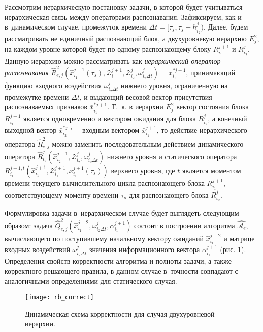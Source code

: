 Рассмотрим иерархическую постановку задачи, в которой будет учитываться иерархическая связь между операторами распознавания. Зафиксируем, как и в~динамическом случае, промежуток времени $\Delta t=[\tau_s,\tau_s+h_{i_2}^j)$. Далее, будем рассматривать не единичный распознающий блок, а двухуровневую иерархию $E_j^2$, на каждом уровне которой будет по одному распознающему блоку $R_{i_1}^{j+1}$ и $R_{i_2}^j$. Данную иерархию можно рассматривать как \textit{иерархический оператор распознавания} $\hat R_{e,j}^2(\hat x_{i_1}^{j+1}(\tau_s),\mathcal Z_{i_1}^{j+1},\mathcal Z_{i_2}^j,\omega_{i_2\Delta t}^j)=\bar x_{i_1}^{*j+1}$, принимающий функцию входного воздействия $\omega_{i_2\Delta t}^j$ нижнего уровня, ограниченную на промежутке времени $\Delta t$, и выдающий весовой вектор присутствия распознаваемых признаков $\bar x_{i_1}^{*j+1}$. Т.~к. в иерархии $E_j^2$ вектор состояния блока $R_{i_1}^{j+1}$ является одновременно и вектором ожидания для блока $R_{i_2}^j$, а конечный выходной вектор $\bar x_{i_2}^{*j}$ "--- входным вектором $\bar x_{i_1}^{j+1}$, то действие иерархического оператора $\hat R_{e,j}^2$ можно заменить последовательным действием динамического оператора $\hat R_{i_2}^j(\hat x _{i_2}^{j+1},\mathcal Z_{i_2}^j,\omega_{i_2\Delta t}^j)$ нижнего уровня и статического оператора $R_{i_1}^{j+1,t}(\hat x _{i_1}^{j+1},\mathcal Z_{i_1}^{j+1},\bar x_{i_1}^{j+1}(\tau_s))$ верхнего уровня, где $t$ является моментом времени текущего вычислительного цикла распознающего блока $R_{i_1}^{j+1}$, соответствующему моменту времени $\tau_s$ для распознающего блока $R_{i_2}^j$.

Формулировка задачи в~иерархическом случае будет выглядеть следующим образом: задача $\hat Q_{e,j}^2(\hat x_{i_1}^{j+2},\omega_{i_2\Delta t}^j,\bar\alpha_{i_1}^{j+1})$ состоит в построении алгоритма $\hat{\mathcal A_e}$, вычисляющего по поступившему начальному вектору ожиданий $\hat x_{i_1}^{j+2}$ и матрице входных воздействий $\omega_{i_2\Delta t}^j$ значения информационного вектора $\bar\alpha_{i_1}^{j+1}$ (рис. \ref{fig:rb_correct_hier}). Определения свойств корректности алгоритма и полноты задачи, а также корректного решающего правила, в данном случае в~точности совпадают с аналогичными определениями для статического случая.

\begin{figure}[h]
	\centering
	\texttt{[image: rb\_correct]}
	\caption{Динамическая схема корректности для случая двухуровневой иерархии.}
	\label{fig:rb_correct_hier}
\end{figure}


